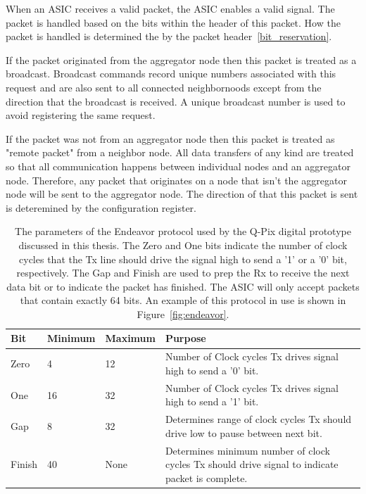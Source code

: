 When an ASIC receives a valid packet, the ASIC enables a valid signal.
The packet is handled based on the bits within the header of this packet.
How the packet is handled is determined the by the packet header~\ref{bit_reservation}.

If the packet originated from the aggregator node then this packet is treated as a broadcast.
Broadcast commands record unique numbers associated with this request and are also sent to all connected neighbornoods except from the direction that the broadcast is received.
A unique broadcast number is used to avoid registering the same request.

If the packet was not from an aggregator node then this packet is treated as "remote packet" from a neighbor node.
All data transfers of any kind are treated so that all communication happens between individual nodes and an aggregator node.
Therefore, any packet that originates on a node that isn't the aggregator node will be sent to the aggregator node.
The direction of that this packet is sent is deteremined by the configuration register.

\begin{table}
\begin{center}
\begin{tabular}{||p{30mm} p{30mm} p{30mm} p{60mm}||}
 \hline
 Bit & Minimum & Maximum & Purpose \\ [0.5ex]
 \hline\hline
 Zero & 4 & 12 & Number of Clock cycles Tx drives signal high to send a '0' bit. \\
 \hline
 One & 16 & 32 & Number of Clock cycles Tx drives signal high to send a '1' bit. \\
 \hline
 Gap & 8 & 32 & Determines range of clock cycles Tx should drive low to pause between next bit. \\
 \hline
 Finish & 40 & None & Determines minimum number of clock cycles Tx should drive signal to indicate packet is complete. \\
 \hline
\end{tabular}
\caption{The parameters of the Endeavor protocol used by the Q-Pix digital prototype discussed in this thesis.
The Zero and One bits indicate the number of clock cycles that the Tx line should drive the signal high to send a '1' or a '0' bit, respectively.
The Gap and Finish are used to prep the Rx to receive the next data bit or to indicate the packet has finished. 
The ASIC will only accept packets that contain exactly 64 bits.
An example of this protocol in use is shown in Figure~\ref{fig:endeavor}.
}
\end{center}
\end{table}
~\label{tab:endeavor_parameters}

